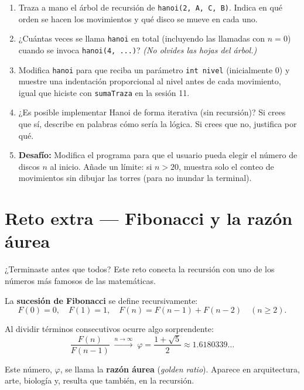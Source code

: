 \documentclass[12pt, oneside]{article}
\begin{document}
\begin{enumerate}
  \item Traza a mano el árbol de recursión de \texttt{hanoi(2, A, C, B)}.
        Indica en qué orden se hacen los movimientos y qué disco se mueve
        en cada uno.

  \item ¿Cuántas veces se llama \texttt{hanoi} en total (incluyendo las
        llamadas con $n=0$) cuando se invoca \texttt{hanoi(4, ...)}?
        \textit{(No olvides las hojas del árbol.)}

  \item Modifica \texttt{hanoi} para que reciba un parámetro
        \texttt{int nivel} (inicialmente 0) y muestre una indentación
        proporcional al nivel antes de cada movimiento, igual que
        hiciste con \texttt{sumaTraza} en la sesión 11.

  \item ¿Es posible implementar Hanoi de forma iterativa (sin recursión)?
        Si crees que sí, describe en palabras cómo sería la lógica.
        Si crees que no, justifica por qué.

  \item \textbf{Desafío:}
        Modifica el programa para que el usuario pueda elegir
        el número de discos $n$ al inicio.
        Añade un límite: si $n > 20$, muestra solo el conteo de movimientos
        sin dibujar las torres (para no inundar la terminal).
\end{enumerate}

\section*{Reto extra — Fibonacci y la razón áurea}

¿Terminaste antes que todos?  Este reto conecta la recursión con uno de los
números más famosos de las matemáticas.

La \textbf{sucesión de Fibonacci} se define recursivamente:
\[
  F(0) = 0, \quad F(1) = 1, \quad F(n) = F(n-1) + F(n-2) \quad (n \geq 2).
\]

Al dividir términos consecutivos ocurre algo sorprendente:
\[
  \frac{F(n)}{F(n-1)} \;\xrightarrow{n \to \infty}\;
  \varphi = \frac{1 + \sqrt{5}}{2} \approx 1.6180339\ldots
\]

Este número, $\varphi$, se llama la \textbf{razón áurea} (\textit{golden ratio}).
Aparece en arquitectura, arte, biología y, resulta que también, en la recursión.
\end{document}
